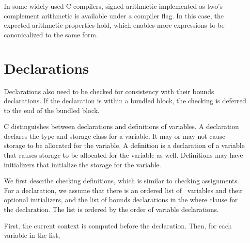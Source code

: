 In some widely-used C compilers, signed arithmetic implemented
as two's complement arithmetic is available under a compiler flag. In
this case, the expected arithmetic properties hold, which enables more
expressions to be canonicalized to the same form.

\section{Declarations}
\label{section:checking-declarations}

Declarations also need to be checked for consistency with their bounds
declarations. If the declaration is within a bundled block, the checking
is deferred to the end of the bundled block.

C distinguishes between declarations and definitions of variables. A
declaration declares the type and storage class for a variable. It may
or may not cause storage to be allocated for the variable. A definition
is a declaration of a variable that causes storage to be allocated for
the variable as well. Definitions may have initializers that initialize
the storage for the variable.

We first describe checking definitions, which is similar to checking
assignments. For a declaration, we assume that there is an ordered list of
\arrayptr\ variables and their optional initializers, and the
list of bounds declarations in the where clause for the declaration. The
list is ordered by the order of variable declarations.

First, the current context is computed before the declaration. Then, for
each variable  in the list,

